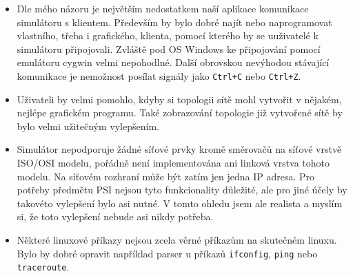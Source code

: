 \begin{itemize}
\item Dle mého názoru je největším nedostatkem naší aplikace komunikace simulátoru s klientem. Především by bylo dobré najít nebo naprogramovat vlastního, třeba i grafického, klienta, pomocí kterého by se uuživatelé k simulátoru připojovali. Zvláště pod OS Windows ke připojování pomocí emulátoru cygwin velmi nepohodlné. Další obrovskou nevýhodou stávající komunikace je nemožnost posílat signály jako \verb|Ctrl+C| nebo \verb|Ctrl+Z|.
\item Uživateli by velmi pomohlo, kdyby si topologii sítě mohl vytvořit v nějakém, nejlépe grafickém programu. Také zobrazování topologie již vytvořené sítě by bylo velmi užitečným vylepšením.
\item Simulátor nepodporuje žádné síťové prvky kromě směrovačů na síťové vrstvě ISO/OSI modelu, pořádně není implementována ani linková vrstva tohoto modelu. Na síťovém rozhraní může být zatím jen jedna IP adresa. Pro potřeby předmětu PSI nejsou tyto funkcionality důležité, ale pro jiné účely by takovéto vylepšení bylo asi nutné. V tomto ohledu jsem ale realista a myslím si, že toto vylepšení nebude asi nikdy potřeba.
\item Některé linuxové příkazy nejsou zcela věrné příkazům na skutečném linuxu. Bylo by dobré opravit například parser u příkazů \verb|ifconfig|, \verb|ping| nebo \verb|traceroute|.
\end{itemize}
